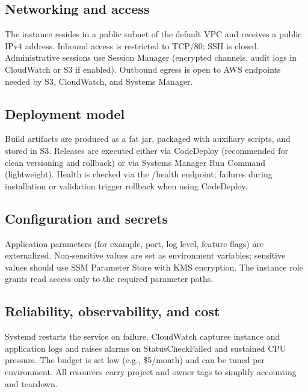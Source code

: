 \documentclass[12pt]{article}
\begin{document}
\subsection{Networking and access}
The instance resides in a public subnet of the default VPC and receives a public IPv4 address. Inbound access is restricted to TCP/80; SSH is closed. Administrative sessions use Session Manager (encrypted channels, audit logs in CloudWatch or S3 if enabled). Outbound egress is open to AWS endpoints needed by S3, CloudWatch, and Systems Manager.

\subsection{Deployment model}
Build artifacts are produced as a fat jar, packaged with auxiliary scripts, and stored in S3. Releases are executed either via CodeDeploy (recommended for clean versioning and rollback) or via Systems Manager Run Command (lightweight). Health is checked via the /health endpoint; failures during installation or validation trigger rollback when using CodeDeploy.

\subsection{Configuration and secrets}
Application parameters (for example, port, log level, feature flags) are externalized. Non‑sensitive values are set as environment variables; sensitive values should use SSM Parameter Store with KMS encryption. The instance role grants read access only to the required parameter paths.

\subsection{Reliability, observability, and cost}
Systemd restarts the service on failure. CloudWatch captures instance and application logs and raises alarms on StatusCheckFailed and sustained CPU pressure. The budget is set low (e.g., \$5/month) and can be tuned per environment. All resources carry project and owner tags to simplify accounting and teardown.
\end{document}
